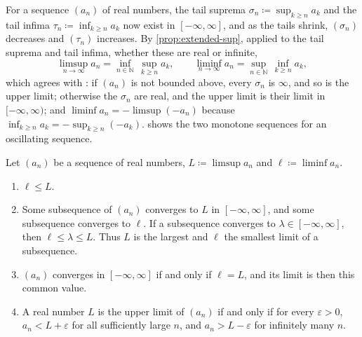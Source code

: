For a sequence $(a_n)$ of real numbers, the tail suprema $\sigma_n\coloneqq\sup_{k\ge n}a_k$ and the tail infima $\tau_n\coloneqq\inf_{k\ge n}a_k$ now exist in $[-\infty,\infty]$, and as the tails shrink, $(\sigma_n)$ decreases and $(\tau_n)$ increases. By \cref{prop:extended-sup}, applied to the tail suprema and tail infima, whether these are real or infinite,
\begin{equation}
\limsup_{n\to\infty}a_n=\inf_{n\in\mathbb N}\,\sup_{k\ge n}a_k,\qquad\liminf_{n\to\infty}a_n=\sup_{n\in\mathbb N}\,\inf_{k\ge n}a_k ,
\label{eq:limsup-inf-sup}
\end{equation}
which agrees with : if $(a_n)$ is not bounded above, every $\sigma_n$ is $\infty$, and so is the upper limit; otherwise the $\sigma_n$ are real, and the upper limit is their limit in $[-\infty,\infty)$; and $\liminf a_n=-\limsup(-a_n)$ because $\inf_{k\ge n}a_k=-\sup_{k\ge n}(-a_k)$.  shows the two monotone sequences for an oscillating sequence.

\begin{theorem}
\label{thm:limsup-properties}
Let $(a_n)$ be a sequence of real numbers, $L\coloneqq\limsup a_n$ and $\ell\coloneqq\liminf a_n$.
\begin{enumerate}
\item $\ell\le L$.
\item Some subsequence of $(a_n)$ converges to $L$ in $[-\infty,\infty]$, and some subsequence converges to $\ell$. If a subsequence converges to $\lambda\in[-\infty,\infty]$, then $\ell\le\lambda\le L$. Thus $L$ is the largest and $\ell$ the smallest limit of a subsequence.
\item $(a_n)$ converges in $[-\infty,\infty]$ if and only if $\ell=L$, and its limit is then this common value.
\item A real number $L$ is the upper limit of $(a_n)$ if and only if for every $\varepsilon>0$, $a_n<L+\varepsilon$ for all sufficiently large $n$, and $a_n>L-\varepsilon$ for infinitely many $n$.
\end{enumerate}
\end{theorem}

